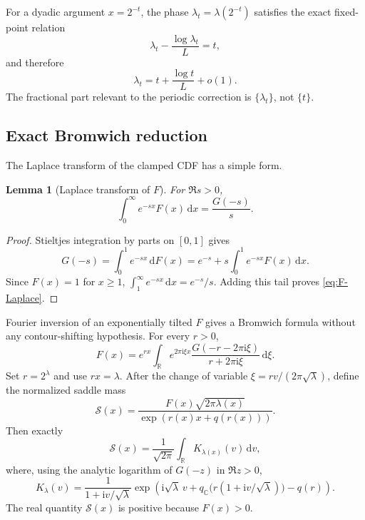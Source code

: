\documentclass[11pt,oneside]{article}
\newtheorem{lemma}[theorem]{Lemma}
\theoremstyle{definition}
\theoremstyle{remark}
\newcommand{\dd}{\,\mathrm d}
\newcommand{\ii}{\mathrm i}
\newcommand{\R}{\mathbb R}
\newcommand{\C}{\mathbb C}
\newcommand{\Lam}{\lambda}
\newcommand{\Ltwo}{L}
\begin{document}
For a dyadic argument $x=2^{-t}$, the phase $\Lam_t=\Lam(2^{-t})$ satisfies the
exact fixed-point relation
\begin{equation}\label{eq:dyadic-phase-fixed}
  \Lam_t-\frac{\log\Lam_t}{\Ltwo}=t,
\end{equation}
and therefore
\begin{equation}\label{eq:dyadic-phase-leading}
  \Lam_t=t+\frac{\log t}{\Ltwo}+o(1).
\end{equation}
The fractional part relevant to the periodic correction is
$\{\Lam_t\}$, not $\{t\}$.

\subsection{Exact Bromwich reduction}

The Laplace transform of the clamped CDF has a simple form.

\begin{lemma}[Laplace transform of $F$]\label{lem:F-Laplace}
For $\Re s>0$,
\begin{equation}\label{eq:F-Laplace}
  \int_0^{\infty}e^{-sx}F(x)\dd x=\frac{G(-s)}s.
\end{equation}
\end{lemma}

\begin{proof}
Stieltjes integration by parts on $[0,1]$ gives
\[
 G(-s)=\int_0^1e^{-sx}\dd F(x)
 =e^{-s}+s\int_0^1e^{-sx}F(x)\dd x.
\]
Since $F(x)=1$ for $x\ge1$,
$\int_1^\infty e^{-sx}\dd x=e^{-s}/s$.  Adding this tail proves
\eqref{eq:F-Laplace}.
\end{proof}

Fourier inversion of an exponentially tilted $F$ gives a Bromwich formula without
any contour-shifting hypothesis.  For every $r>0$,
\begin{equation}\label{eq:F-Bromwich}
 F(x)=e^{rx}\int_{\R}e^{2\pi\ii\xi x}
 \frac{G(-r-2\pi\ii\xi)}{r+2\pi\ii\xi}\dd\xi.
\end{equation}
Set $r=2^{\Lam}$ and use $rx=\Lam$.  After the change of variable
$\xi=rv/(2\pi\sqrt\Lam)$, define the normalized saddle mass
\begin{equation}\label{eq:saddle-mass-def}
 \mathcal S(x)=
 \frac{F(x)\sqrt{2\pi\Lam(x)}}
 {\exp(r(x)x+q(r(x)))}.
\end{equation}
Then exactly
\begin{equation}\label{eq:saddle-mass-integral}
 \mathcal S(x)=\frac1{\sqrt{2\pi}}\int_{\R}K_{\Lam(x)}(v)\dd v,
\end{equation}
where, using the analytic logarithm of $G(-z)$ in $\Re z>0$,
\begin{equation}\label{eq:saddle-kernel}
 K_\Lam(v)=\frac{1}{1+\ii v/\sqrt\Lam}
 \exp\left(
   \ii\sqrt\Lam\,v
   +q_{\C}\bigl(r(1+\ii v/\sqrt\Lam)\bigr)-q(r)
 \right).
\end{equation}
The real quantity $\mathcal S(x)$ is positive because $F(x)>0$.
\end{document}
